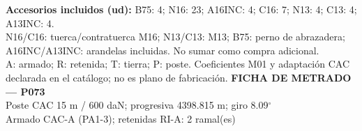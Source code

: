 \begingroup\scriptsize
\textbf{Accesorios incluidos (ud):} B75: 4; N16: 23; A16INC: 4; C16: 7; N13: 4; C13: 4; A13INC: 4.\\
N16/C16: tuerca/contratuerca M16; N13/C13: M13; B75: perno de abrazadera; A16INC/A13INC: arandelas incluidas. No sumar como compra adicional.\\
A: armado; R: retenida; T: tierra; P: poste. Coeficientes M01 y adaptación CAC declarada en el catálogo; no es plano de fabricación.
\endgroup\endgroup
\clearpage{}
\begingroup\small\setlength{\parskip}{3pt}\renewcommand{\arraystretch}{1.05}
\textbf{\large FICHA DE METRADO — P073}\\[4pt]
Poste CAC 15 m / 600 daN; progresiva 4398.815 m; giro 8.09\ensuremath{^\circ}\\
Armado CAC-A (PA1-3); retenidas RI-A: 2 ramal(es)\\
\begingroup\scriptsize
